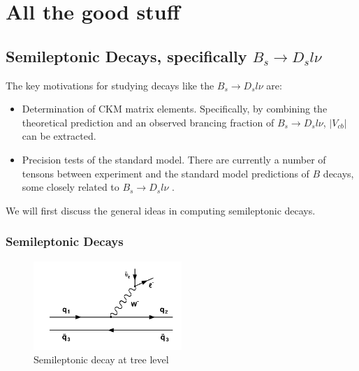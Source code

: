 \chapter{All the good stuff}
\label{chap:sm}


\section{Semileptonic Decays, specifically $B_s \to D_s l \nu$}
\label{sec:semileptonic}

The key motivations for studying decays like the $B_s \to D_s l\nu$ are:
\begin{itemize}
	\item
	Determination of CKM matrix elements. Specifically, by combining the theoretical prediction and an observed brancing fraction of $B_s \to D_s l\nu$, $|V_{cb}|$ can be extracted.
	\item
	Precision tests of the standard model. There are currently a number of tensons between experiment and the standard model predictions of $B$ decays, some closely related to $B_s \to D_s l\nu$ \cite{Na:2015kha}.
\end{itemize}
We will first discuss the general ideas in computing semileptonic decays.

\subsection{Semileptonic Decays}
\label{sec:cp}

\begin{figure}
  \begin{center}
  \vspace{-25pt}
    \includegraphics[width=
   0.5\textwidth]{images/semileptonic.png}
     \vspace{-25pt}
  \end{center}
  \caption{Semileptonic decay at tree level}
  \vspace{+10pt}
  \label{fig:semileptonic}
\end{figure}

